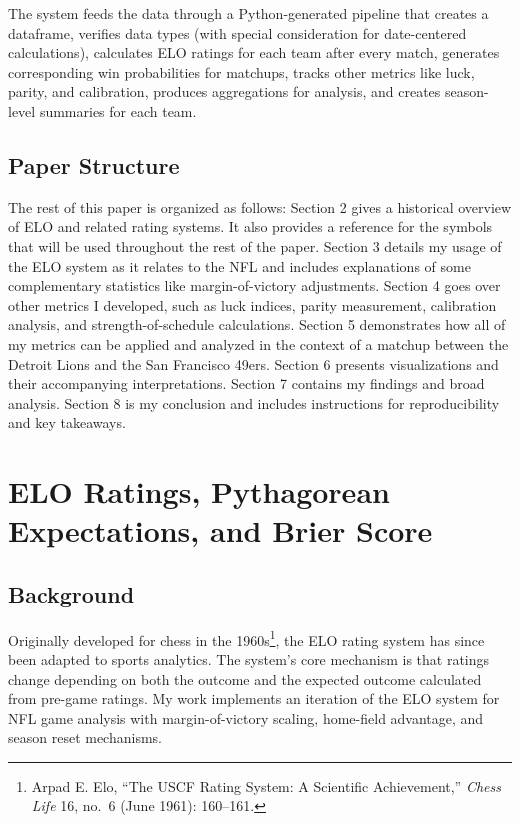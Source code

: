 \documentclass[a4paper,10.5pt,twoside]{article}
\begin{document}
The system feeds the data through a Python-generated pipeline that creates a dataframe, verifies data types (with special consideration for date-centered calculations), calculates ELO ratings for each team after every match, generates corresponding win probabilities for matchups, tracks other metrics like luck, parity, and calibration, produces aggregations for analysis, and creates season-level summaries for each team.

\subsection{Paper Structure}

The rest of this paper is organized as follows: Section 2 gives a historical overview of ELO and related rating systems. It also provides a reference for the symbols that will be used throughout the rest of the paper. Section 3 details my usage of the ELO system as it relates to the NFL and includes explanations of some complementary statistics like margin-of-victory adjustments. Section 4 goes over other metrics I developed, such as luck indices, parity measurement, calibration analysis, and strength-of-schedule calculations. Section 5 demonstrates how all of my metrics can be applied and analyzed in the context of a matchup between the Detroit Lions and the San Francisco 49ers. Section 6 presents visualizations and their accompanying interpretations. Section 7 contains my findings and broad analysis. Section 8 is my conclusion and includes instructions for reproducibility and key takeaways.

\newpage
\section{ELO Ratings, Pythagorean Expectations, and Brier Score}
\subsection{Background}

Originally developed for chess in the 1960s\footnote{Arpad E. Elo, “The USCF Rating System: A Scientific Achievement,” \textit{Chess Life} 16, no.\ 6 (June 1961): 160--161.}, the ELO rating system has since been adapted to sports analytics. The system’s core mechanism is that ratings change depending on both the outcome and the expected outcome calculated from pre-game ratings. My work implements an iteration of the ELO system for NFL game analysis with margin-of-victory scaling, home-field advantage, and season reset mechanisms.
\end{document}
